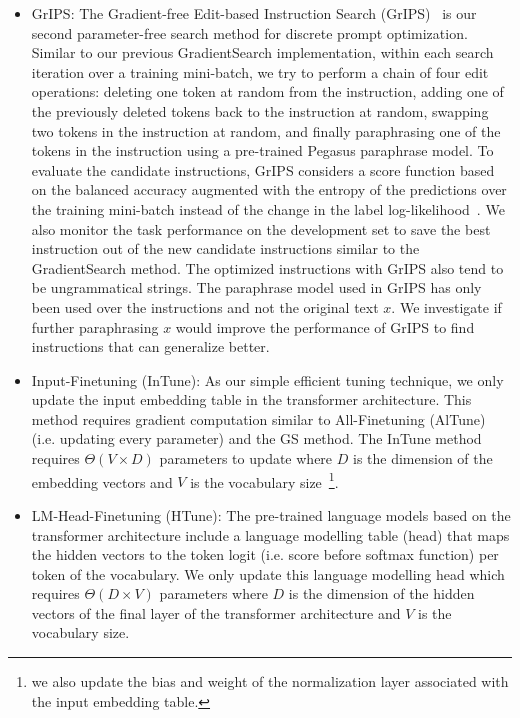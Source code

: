 \documentclass[11pt]{article}
\begin{document}
\begin{itemize}
    \item GrIPS: The Gradient-free Edit-based Instruction Search (GrIPS)~\cite{prasad-etal-2023-grips} is our second parameter-free search method for discrete prompt optimization. Similar to our previous GradientSearch implementation, within each search iteration over a training mini-batch, we try to perform a chain of four edit operations: deleting one token at random from the instruction, adding one of the previously deleted tokens back to the instruction at random, swapping two tokens in the instruction at random, and finally paraphrasing one of the tokens in the instruction using a pre-trained Pegasus paraphrase model. To evaluate the candidate instructions, GrIPS considers a score function based on the balanced accuracy augmented with the entropy of the predictions over the training mini-batch instead of the change in the label log-likelihood~\cite{prasad-etal-2023-grips}. We also monitor the task performance on the development set to save the best instruction out of the new candidate instructions similar to the GradientSearch method. The optimized instructions with GrIPS also tend to be ungrammatical strings. The paraphrase model used in GrIPS has only been used over the instructions and not the original text $x$. We investigate if further paraphrasing $x$ would improve the performance of GrIPS to find instructions that can generalize better.
    \item Input-Finetuning (InTune): As our simple efficient tuning technique, we only update the input embedding table in the transformer architecture. This method requires gradient computation similar to All-Finetuning (AlTune) (i.e. updating every parameter) and the GS method. The InTune method requires $\Theta(V \times D)$ parameters to update where $D$ is the dimension of the embedding vectors and $V$ is the vocabulary size~\footnote{we also update the bias and weight of the normalization layer associated with the input embedding table.}.
    \item LM-Head-Finetuning (HTune): The pre-trained language models based on the transformer architecture include a language modelling table (head) that maps the hidden vectors to the token logit (i.e. score before softmax function) per token of the vocabulary. We only update this language modelling head which requires $\Theta(D \times V)$ parameters where $D$ is the dimension of the hidden vectors of the final layer of the transformer architecture and $V$ is the vocabulary size.

\end{itemize}
\end{document}
